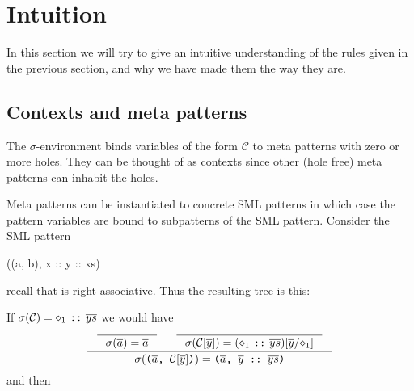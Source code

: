 \section{Intuition}
In this section we will try to give an intuitive understanding of the rules
given in the previous section, and why we have made them the way they are.

\subsection{Contexts and meta patterns}
The $\sigma$-environment binds variables of the form $\mathcal{C}$ to meta
patterns with zero or more holes. They can be thought of as contexts since other
(hole free) meta patterns can inhabit the holes.

Meta patterns can be instantiated to concrete SML patterns in which case the
pattern variables are bound to subpatterns of the SML pattern. Consider the SML
pattern
\begin{sml}
((a, b), x :: y :: xs)
\end{sml}
recall that \ttt{::} is right associative. Thus the resulting tree is this:
\begin{center}
\end{center}

If $\sigma(\mathcal{C}) = \diamond_1\ \ttt{::}\ \ol{ys}$ we would have
\[
\inference
{
  \inference
  {}
  {
    \sigma(\ol{a}) = \ol{a}
  } &
  \inference
  {}
  {
    \sigma(\mathcal{C}[\ol{y}]) = (\diamond_1\ \ttt{::}\ \ol{ys})[\ol{y}/\diamond_1]
  }
}
{
  \sigma(\ttt{($\ol{a}$, $\mathcal{C}[\ol{y}]$)}) =
  \ttt{($\ol{a}$, $\ol{y}\ $::$\ \ol{ys}$)}
}
\]
and then

